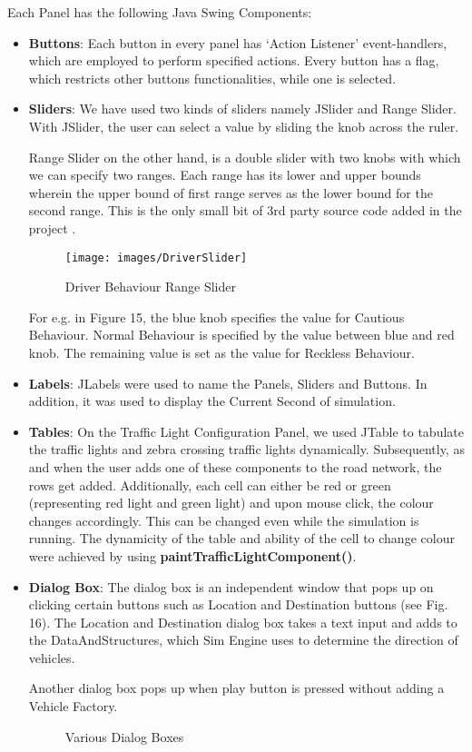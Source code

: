 \documentclass[11pt,a4paper]{article}
\begin{document}
	
	Each Panel has the following Java Swing Components:
	\begin{itemize}
		\item \textbf{Buttons}: Each button in every panel has ‘Action Listener’ event-handlers, which are employed to perform specified actions. Every button has a flag, which restricts other buttons functionalities, while one is selected.
		\item \textbf{Sliders}: We have used two kinds of sliders namely JSlider and Range Slider. With JSlider, the user can select a value by sliding the knob across the ruler. 
			
			Range Slider on the other hand, is a double slider with two
			knobs with which we can specify two ranges. Each range has
			its lower and upper bounds wherein the upper bound of first range serves as the lower bound for the second range. This is the only small bit of 3rd party source code added in the project \cite{ernie10}.
			 
			 \begin{figure}[h!]
				\texttt{[image: images/DriverSlider]}
				\caption{Driver Behaviour Range Slider}
				\centering
			\end{figure}
		
			For e.g. in Figure 15, the blue knob specifies the value
			for Cautious Behaviour. Normal Behaviour is specified by
			the value between blue and red knob. The remaining value is
			set as the value for Reckless Behaviour.
		\item \textbf{Labels}: JLabels were used to name the Panels, Sliders and Buttons. In addition, it was used to display the Current Second of simulation.
		\item \textbf{Tables}: On the Traffic Light Configuration Panel, we used JTable to tabulate the traffic lights and zebra crossing traffic lights dynamically. Subsequently, as and when the user adds one of these components to the road network, the rows get added. 
			Additionally, each cell can either be red or green
			(representing red light and green light) and upon mouse
			click, the colour changes accordingly. This can be changed
			even while the simulation is running.
			The dynamicity of the table and ability of the cell to
			change colour were achieved by using	\textbf{paintTrafficLightComponent()}.
		\item \textbf{Dialog Box}: The dialog box is an independent window that pops up on clicking certain buttons such as Location and Destination buttons (see Fig. 16). The Location and Destination dialog box takes a text input and adds to the DataAndStructures, which Sim Engine uses to determine the direction of vehicles.
			
			Another dialog box pops up when play button is pressed
			without adding a Vehicle Factory.

			\begin{figure}[h!]
				\setlength\fboxsep{0pt}
				\setlength\fboxrule{0.5pt}
				\caption{Various Dialog Boxes}
				\centering
			\end{figure}
	\end{itemize}
\end{document}

